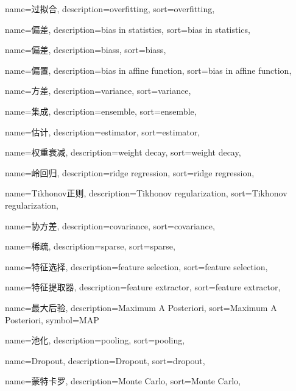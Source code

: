 {
  name=过拟合,
  description={overfitting},
  sort={overfitting},
}

{
  name=偏差,
  description={bias in statistics},
  sort={bias in statistics},
}

{
  name=偏差,
  description={biass},
  sort={biass},
}

{
  name=偏置,
  description={bias in affine function},
  sort={bias in affine function},
}

{
  name=方差,
  description={variance},
  sort={variance},
}

{
  name=集成,
  description={ensemble},
  sort={ensemble},
}

{
  name=估计,
  description={estimator},
  sort={estimator},
}

{
  name=权重衰减,
  description={weight decay},
  sort={weight decay},
}

{
  name=岭回归,
  description={ridge regression},
  sort={ridge regression},
}

{
  name=Tikhonov正则,
  description={Tikhonov regularization},
  sort={Tikhonov regularization},
}

{
  name=协方差,
  description={covariance},
  sort={covariance},
}

{
  name=稀疏,
  description={sparse},
  sort={sparse},
}

{
  name=特征选择,
  description={feature selection},
  sort={feature selection},
}

{
  name=特征提取器,
  description={feature extractor},
  sort={feature extractor},
}

{
  name=最大后验,
  description={Maximum A Posteriori},
  sort={Maximum A Posteriori},
  symbol={MAP}
}

{
  name=池化,
  description={pooling},
  sort={pooling},
}

{
  name=Dropout,
  description={Dropout},
  sort={dropout},
}

{
  name=蒙特卡罗,
  description={Monte Carlo},
  sort={Monte Carlo},
}

